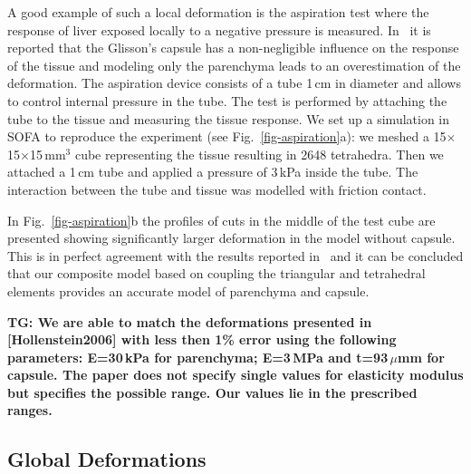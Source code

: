 \documentclass[final,3p,times,twocolumn]{elsarticle}
\newcommand{\TG}[1]{{\color{blue}\textbf{TG: #1}}}
\begin{document}
A good example of such a local deformation is the aspiration test
where the response of liver exposed locally to a negative pressure is measured.
In~\cite{Hollenstein2006} it is reported that the Glisson's
capsule has a non-negligible influence on the response of the tissue and modeling
only the parenchyma leads to an overestimation of the deformation. 
The aspiration device consists of a tube 1\,cm in diameter and allows
to control internal pressure in the tube. The test is performed by
attaching the tube to the tissue and measuring the tissue response. We
set up a simulation in SOFA to reproduce the experiment (see Fig.~\ref{fig-aspiration}a): we meshed a 15$\times$15$\times$15\,mm$^3$ 
cube representing the tissue 
resulting in 2648 tetrahedra. Then we attached a 1\,cm tube 
and applied a pressure of 3\,kPa inside the tube. The interaction between the tube and 
tissue was modelled with friction contact. 

In Fig.~\ref{fig-aspiration}b the profiles of cuts in the middle of the
test cube are presented showing significantly larger deformation in the model without capsule. This is in perfect 
agreement with the results reported in~\cite{Hollenstein2006} and it can be concluded that 
our composite model based on coupling the triangular and tetrahedral elements provides an accurate 
model of parenchyma and capsule.

\TG{
  We are able to match the deformations presented in
  [Hollenstein2006] with less then 1\% error using the following
  parameters: E=30\,kPa for parenchyma; E=3\,MPa and t=93\,$\mu$mm for capsule.
  The paper does not specify single values for elasticity modulus but specifies
  the possible range. Our values lie in the prescribed ranges.}




\subsection{Global Deformations} %
\end{document}
